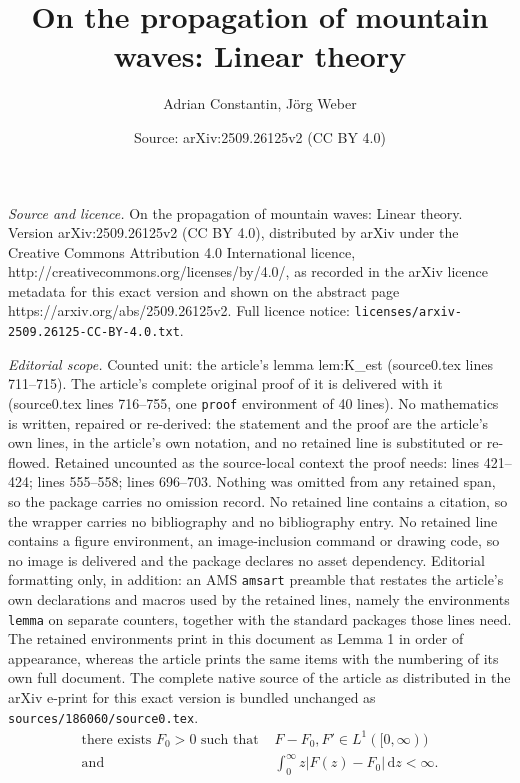 \documentclass[10pt,a4paper]{amsart}
\title{On the propagation of mountain waves: Linear theory}
\author{Adrian Constantin, J\"org Weber}
\date{Source: arXiv:2509.26125v2 (CC BY 4.0)}
\newcommand{\dd}{\mathrm d}
\begin{document}
\maketitle

\noindent\emph{Source and licence.} On the propagation of mountain waves: Linear theory. Version arXiv:2509.26125v2 (CC BY 4.0), distributed by arXiv under the Creative Commons Attribution 4.0 International licence, http://creativecommons.org/licenses/by/4.0/, as recorded in the arXiv licence metadata for this exact version and shown on the abstract page https://arxiv.org/abs/2509.26125v2. Full licence notice: \texttt{licenses/arxiv-2509.26125-CC-BY-4.0.txt}.\par\smallskip

\noindent\textit{Editorial scope.} Counted unit: the article's lemma lem:K\_est (source0.tex lines 711--715). The article's complete original proof of it is delivered with it (source0.tex lines 716--755, one \texttt{proof} environment of 40 lines). No mathematics is written, repaired or re-derived: the statement and the proof are the article's own lines, in the article's own notation, and no retained line is substituted or re-flowed.  Retained uncounted as the source-local context the proof needs: lines 421--424; lines 555--558; lines 696--703.  Nothing was omitted from any retained span, so the package carries no omission record.  No retained line contains a citation, so the wrapper carries no bibliography and no bibliography entry.  No retained line contains a figure environment, an image-inclusion command or drawing code, so no image is delivered and the package declares no asset dependency.  Editorial formatting only, in addition: an AMS \texttt{amsart} preamble that restates the article's own declarations and macros used by the retained lines, namely the environments \texttt{lemma} on separate counters, together with the standard packages those lines need.  The retained environments print in this document as Lemma 1 in order of appearance, whereas the article prints the same items with the numbering of its own full document.  The complete native source of the article as distributed in the arXiv e-print for this exact version is bundled unchanged as \texttt{sources/186060/source0.tex}.
\begin{align}
	\text{there exists }F_0 > 0 \text{ such that }& F-F_0, F' \in L^1([0,\infty))\nonumber\\
	\text{and }&\int_0^\infty z|F(z)-F_0|\,\dd z<\infty.\tag{A}\label{ass:A}
\end{align}
\end{document}
